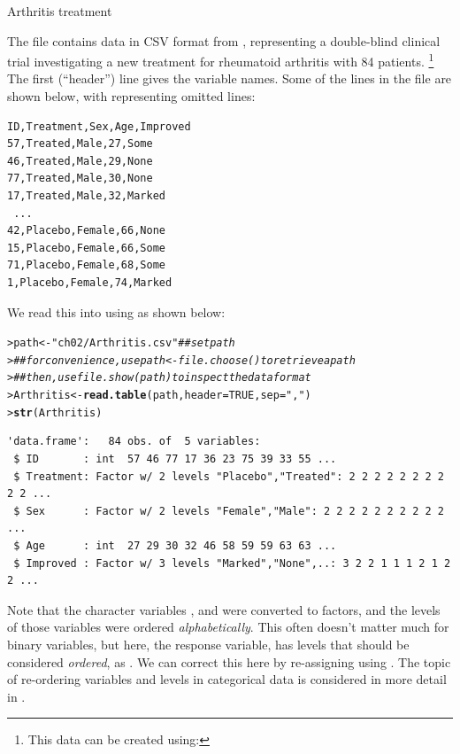 \documentclass[10pt,krantz2]{krantz}\usepackage[]{graphicx}\usepackage[]{color}
\makeatletter
\newcommand{\hlnum}[1]{\textcolor[rgb]{0.686,0.059,0.569}{#1}}%
\newcommand{\hlstr}[1]{\textcolor[rgb]{0.192,0.494,0.8}{#1}}%
\newcommand{\hlcom}[1]{\textcolor[rgb]{0.678,0.584,0.686}{\textit{#1}}}%
\newcommand{\hlstd}[1]{\textcolor[rgb]{0.345,0.345,0.345}{#1}}%
\newcommand{\hlkwb}[1]{\textcolor[rgb]{0.69,0.353,0.396}{#1}}%
\newcommand{\hlkwc}[1]{\textcolor[rgb]{0.333,0.667,0.333}{#1}}%
\newcommand{\hlkwd}[1]{\textcolor[rgb]{0.737,0.353,0.396}{\textbf{#1}}}%
\newenvironment{kframe}{%
 \def\at@end@of@kframe{}%
 \ifinner\ifhmode%
  \def\at@end@of@kframe{\end{minipage}}%
  \begin{minipage}{\columnwidth}%
 \fi\fi%
 \def\FrameCommand##1{\hskip\@totalleftmargin \hskip-\fboxsep
 \colorbox{shadecolor}{##1}\hskip-\fboxsep
     \hskip-\linewidth \hskip-\@totalleftmargin \hskip\columnwidth}%
 \MakeFramed {\advance\hsize-\width
   \@totalleftmargin\z@ \linewidth\hsize
   \@setminipage}}%
 {\par\unskip\endMakeFramed%
 \at@end@of@kframe}
\newenvironment{knitrout}{}{} %
\renewenvironment{knitrout}{\small\renewcommand{\baselinestretch}{.85}}{} %
\makeatother
\begin{document}
\begin{Example}{Arthritis treatment}

The file  contains data in CSV format
from \citet{KochEdwards:88}, representing
a double-blind clinical trial investigating a new treatment for rheumatoid arthritis with 84 patients.
\footnote{This data can be created using:  }
The first (``header'') line gives the variable names.  Some of the
lines in the file are shown below, with  representing omitted lines:
{\small
\renewcommand{\baselinestretch}{.85}
\begin{verbatim}
ID,Treatment,Sex,Age,Improved
57,Treated,Male,27,Some
46,Treated,Male,29,None
77,Treated,Male,30,None
17,Treated,Male,32,Marked
 ...
42,Placebo,Female,66,None
15,Placebo,Female,66,Some
71,Placebo,Female,68,Some
1,Placebo,Female,74,Marked
\end{verbatim}
}


We read this into \R using  as shown below:
\begin{knitrout}\footnotesize
{}\color{fgcolor}\begin{kframe}
\begin{alltt}
\hlstd{> }\hlstd{path} \hlkwb{<-} \hlstr{"ch02/Arthritis.csv"} \hlcom{## set path}
\hlstd{> }\hlcom{## for convenience, use path <- file.choose() to retrieve a path }
\hlstd{> }\hlcom{## then, use file.show(path) to inspect the data format}
\hlstd{> }\hlstd{Arthritis} \hlkwb{<-} \hlkwd{read.table}\hlstd{(path,} \hlkwc{header} \hlstd{=} \hlnum{TRUE}\hlstd{,} \hlkwc{sep} \hlstd{=} \hlstr{","}\hlstd{)}
\hlstd{> }\hlkwd{str}\hlstd{(Arthritis)}
\end{alltt}
\begin{verbatim}
'data.frame':	84 obs. of  5 variables:
 $ ID       : int  57 46 77 17 36 23 75 39 33 55 ...
 $ Treatment: Factor w/ 2 levels "Placebo","Treated": 2 2 2 2 2 2 2 2 2 2 ...
 $ Sex      : Factor w/ 2 levels "Female","Male": 2 2 2 2 2 2 2 2 2 2 ...
 $ Age      : int  27 29 30 32 46 58 59 59 63 63 ...
 $ Improved : Factor w/ 3 levels "Marked","None",..: 3 2 2 1 1 1 2 1 2 2 ...
\end{verbatim}
\end{kframe}
\end{knitrout}
Note that the character variables ,  and 
were converted to factors, and the levels of those variables were
ordered \emph{alphabetically}.  This often doesn't matter much for binary variables,
but here, the response variable,  has levels
that should be considered \emph{ordered},
as .  We can correct this here by
re-assigning  using .
The topic of re-ordering variables and levels in categorical data is
considered in more detail in .


\end{Example}
\end{document}
